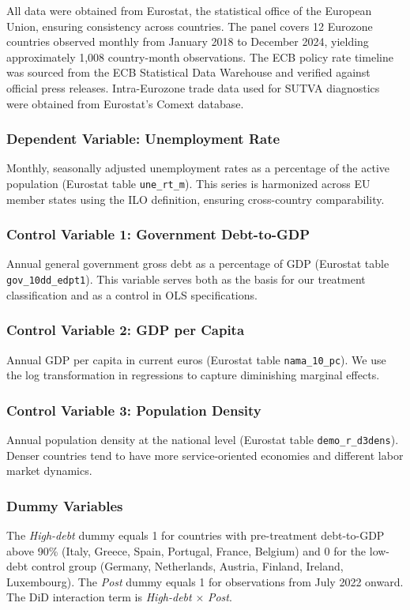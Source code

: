 \documentclass[12pt,a4paper]{article}
\begin{document}
All data were obtained from Eurostat, the statistical office of the European Union, ensuring consistency across countries. The panel covers 12 Eurozone countries observed monthly from January 2018 to December 2024, yielding approximately 1,008 country-month observations. The ECB policy rate timeline was sourced from the ECB Statistical Data Warehouse and verified against official press releases. Intra-Eurozone trade data used for SUTVA diagnostics were obtained from Eurostat's Comext database.

\subsubsection{Dependent Variable: Unemployment Rate}
Monthly, seasonally adjusted unemployment rates as a percentage of the active population (Eurostat table \texttt{une\_rt\_m}). This series is harmonized across EU member states using the ILO definition, ensuring cross-country comparability.

\subsubsection{Control Variable 1: Government Debt-to-GDP}
Annual general government gross debt as a percentage of GDP (Eurostat table \texttt{gov\_10dd\_edpt1}). This variable serves both as the basis for our treatment classification and as a control in OLS specifications.

\subsubsection{Control Variable 2: GDP per Capita}
Annual GDP per capita in current euros (Eurostat table \texttt{nama\_10\_pc}). We use the log transformation in regressions to capture diminishing marginal effects.

\subsubsection{Control Variable 3: Population Density}
Annual population density at the national level (Eurostat table \texttt{demo\_r\_d3dens}). Denser countries tend to have more service-oriented economies and different labor market dynamics.

\subsubsection{Dummy Variables}
The \textit{High-debt} dummy equals 1 for countries with pre-treatment debt-to-GDP above 90\% (Italy, Greece, Spain, Portugal, France, Belgium) and 0 for the low-debt control group (Germany, Netherlands, Austria, Finland, Ireland, Luxembourg). The \textit{Post} dummy equals 1 for observations from July 2022 onward. The DiD interaction term is \textit{High-debt} $\times$ \textit{Post}.
\end{document}

